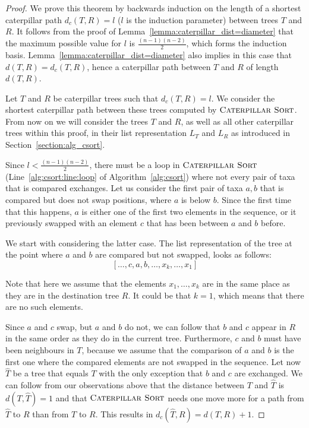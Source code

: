 \documentclass{amsart}
\newcommand{\csort}{\textsc{Caterpillar Sort}}
\begin{document}
\begin{proof}
We prove this theorem by backwards induction on the length of a shortest caterpillar path $d_c(T,R) = l$ ($l$ is the induction parameter) between trees $T$ and $R$.
It follows from the proof of Lemma~\ref{lemma:caterpillar_dist=diameter} that the maximum possible value for $l$ is $\frac{(n-1)(n-2)}{2}$, which forms the induction basis.
Lemma~\ref{lemma:caterpillar_dist=diameter} also implies in this case that $d(T, R) = d_c(T, R)$, hence a caterpillar path between $T$ and $R$ of length $d(T, R)$.

Let $T$ and $R$ be caterpillar trees such that $d_c(T, R) = l$.
We consider the shortest caterpillar path between these trees computed by $\csort$.
From now on we will consider the trees $T$ and $R$, as well as all other caterpillar trees within this proof, in their list representation $L_T$ and $L_R$ as introduced in Section~\ref{section:alg_csort}.

Since $l < \frac{(n-1)(n-2)}{2}$, there must be a loop in $\csort$ (Line~\ref{alg:csort:line:loop} of Algorithm~\ref{alg:csort}) where not every pair of taxa that is compared exchanges.
Let us consider the first pair of taxa $a,b$ that is compared but does not swap positions, where $a$ is below $b$.
Since the first time that this happens, $a$ is either one of the first two elements in the sequence, or it previously swapped with an element $c$ that has been between $a$ and $b$ before.

We start with considering the latter case.
The list representation of the tree at the point where $a$ and $b$ are compared but not swapped, looks as follows:
\[[\ldots, c, a, b, \ldots, x_k, \ldots, x_1]\]

Note that here we assume that the elements $x_1, \ldots, x_k$ are in the same place as they are in the destination tree $R$.
It could be that $k=1$, which means that there are no such elements.

Since $a$ and $c$ swap, but $a$ and $b$ do not, we can follow that $b$ and $c$ appear in $R$ in the same order as they do in the current tree.
Furthermore, $c$ and $b$ must have been neighbours in $T$, because we assume that the comparison of $a$ and $b$ is the first one where the compared elements are not swapped in the sequence.
Let now $\hat T$ be a tree that equals $T$ with the only exception that $b$ and $c$ are exchanged.
We can follow from our observations above that the distance between $T$ and $\hat T$ is $d(T, \hat T) = 1$ and that $\csort$ needs one move more for a path from $\hat T$ to $R$ than from $T$ to $R$.
This results in $d_c(\hat T, R) = d(T,R) + 1$.


\end{proof}
\end{document}
